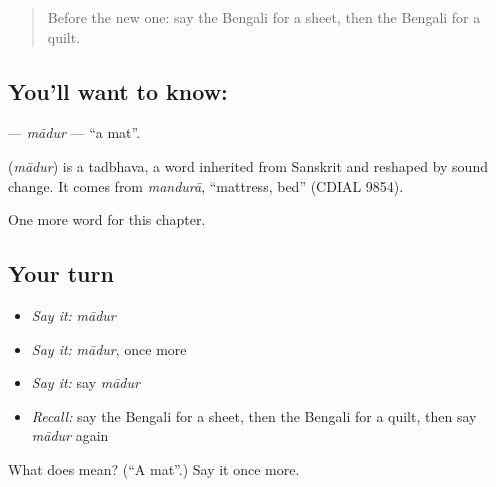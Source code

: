 \label{lesson:BN-C108-madur}



\begin{quote}
Before the new one: say the Bengali for a sheet, then the Bengali for a quilt.
\end{quote}

\subsection*{You'll want to know: }
\textbf{} — \emph{mādur} — \textquotedblleft{}a mat\textquotedblright{}.

\begin{cousinweb}
\textbf{} (\emph{mādur}) is a tadbhava, a word inherited from Sanskrit and reshaped by sound change. It comes from \emph{mandurā}, \textquotedblleft{}mattress, bed\textquotedblright{} (CDIAL 9854).
\end{cousinweb}

\begin{grammarlens}[title={What you've built}]
One more word for this chapter.
\end{grammarlens}

\subsection*{Your turn}
\begin{itemize}
\raggedright
  \item \emph{Say it:} \emph{mādur}
  \item \emph{Say it:} \emph{mādur}, once more
  \item \emph{Say it:} say \emph{mādur}
  \item \emph{Recall:} say the Bengali for a sheet, then the Bengali for a quilt, then say \emph{mādur} again
\end{itemize}

\begin{tcolorbox}[breakable,colback=teal!4,colframe=teal!35!black,title={Before you move on}]
What does  mean? (\textquotedblleft{}A mat\textquotedblright{}.) Say it once more.
\end{tcolorbox}
